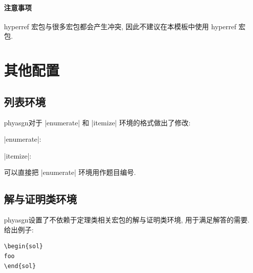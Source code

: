 \documentclass{phyasgn}\usepackage{nag}
\newcommand\pkg[1]{\textsf{#1}}
\def\phyasgn{\pkg{phyasgn}}
\begin{document}
\paragraph{注意事项} 
\pkg{hyperref} 宏包与很多宏包都会产生冲突,\marginpar{\dbend} 
因此不建议在本模板中使用 \pkg{hyperref} 宏包.



\section{其他配置}
\subsection{列表环境}
\phyasgn 对于 |enumerate| 和 |itemize| 环境的格式做出了修改:

|enumerate|:
\begin{center}
\end{center}

|itemize|:
\begin{center}
\end{center}
可以直接把 |enumerate| 环境用作题目编号.

\subsection{解与证明类环境}
\phyasgn 设置了不依赖于定理类相关宏包的解与证明类环境, 用于满足解答的需要. 给出例子: 
\begin{flushleft}
\begin{minipage}{\textwidth}
\begin{minipage}{0.48\textwidth}
\begin{Verbatim}
\begin{sol}
foo
\end{sol}
\end{Verbatim}
\end{minipage}
\hfill
{}
\end{minipage}
\end{flushleft}
\end{document}
